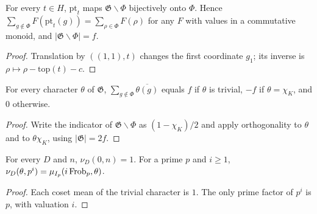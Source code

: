 \begin{lemma}\label{bal:partner-bij}
For every $t\in H$, $\mathrm{pt}_t$ maps $\mathfrak G\smallsetminus\Phi$ bijectively onto $\Phi$. Hence $\sum_{g\notin\Phi}F(\mathrm{pt}_t(g))=\sum_{\rho\in\Phi}F(\rho)$ for any $F$ with values in a commutative monoid, and $|\mathfrak G\smallsetminus\Phi|=f$.
\end{lemma}
\begin{proof}
Translation by $((1,1),t)$ changes the first coordinate $g_1$; its inverse is $\rho\mapsto\rho-\mathrm{top}(t)-c$.
\end{proof}

\begin{lemma}\label{bal:colour-sum}
For every character $\theta$ of $\mathfrak G$,
$\sum_{g\notin\Phi}\overline{\theta(g)}$ equals $f$ if $\theta$ is trivial, $-f$ if $\theta=\chi_K$, and $0$ otherwise.
\end{lemma}
\begin{proof}
Write the indicator of $\mathfrak G\smallsetminus\Phi$ as $(1-\chi_K)/2$ and apply orthogonality to $\theta$ and to $\theta\chi_K$, using $|\mathfrak G|=2f$.
\end{proof}

\begin{lemma}\label{bal:prim-val-pow}
For every $D$ and $n$, $\nu_D(0,n)=1$. For a prime $p$ and $i\ge1$, $\nu_D(\theta,p^i)=\mu_{I_p}(i\operatorname{Frob}_p,\theta)$.
\end{lemma}
\begin{proof}
Each coset mean of the trivial character is $1$. The only prime factor of $p^i$ is $p$, with valuation $i$.
\end{proof}

